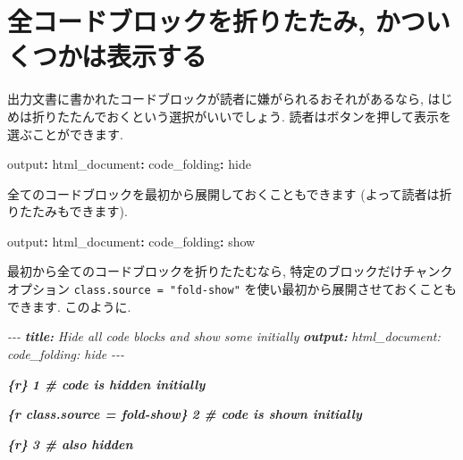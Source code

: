\documentclass[
  11pt,
  lualatex,
  ja=standard]{bxjsreport}
\newenvironment{Shaded}{\begin{snugshade}}{\end{snugshade}}
\newcommand{\AnnotationTok}[1]{\textcolor[rgb]{0.56,0.35,0.01}{\textbf{\textit{#1}}}}
\newcommand{\AttributeTok}[1]{\textcolor[rgb]{0.77,0.63,0.00}{#1}}
\newcommand{\CommentTok}[1]{\textcolor[rgb]{0.56,0.35,0.01}{\textit{#1}}}
\newcommand{\FunctionTok}[1]{\textcolor[rgb]{0.00,0.00,0.00}{#1}}
\newcommand{\InformationTok}[1]{\textcolor[rgb]{0.56,0.35,0.01}{\textbf{\textit{#1}}}}
\newcommand{\KeywordTok}[1]{\textcolor[rgb]{0.13,0.29,0.53}{\textbf{#1}}}
\begin{document}
\hypertarget{fold-show}{%
\section{全コードブロックを折りたたみ, かついくつかは表示する}\label{fold-show}}

出力文書に書かれたコードブロックが読者に嫌がられるおそれがあるなら, はじめは折りたたんでおくという選択がいいでしょう. 読者はボタンを押して表示を選ぶことができます.

\begin{Shaded}
\begin{Highlighting}[]
\FunctionTok{output}\KeywordTok{:}
\AttributeTok{  }\FunctionTok{html\_document}\KeywordTok{:}
\AttributeTok{    }\FunctionTok{code\_folding}\KeywordTok{:}\AttributeTok{ hide}
\end{Highlighting}
\end{Shaded}

全てのコードブロックを最初から展開しておくこともできます (よって読者は折りたたみもできます).

\begin{Shaded}
\begin{Highlighting}[]
\FunctionTok{output}\KeywordTok{:}
\AttributeTok{  }\FunctionTok{html\_document}\KeywordTok{:}
\AttributeTok{    }\FunctionTok{code\_folding}\KeywordTok{:}\AttributeTok{ show}
\end{Highlighting}
\end{Shaded}

最初から全てのコードブロックを折りたたむなら, 特定のブロックだけチャンクオプション \texttt{class.source = "fold-show"} を使い最初から展開させておくこともできます. このように.

\begin{Shaded}
\begin{Highlighting}[]
\CommentTok{{-}{-}{-}}
\AnnotationTok{title:}\CommentTok{ Hide all code blocks and show some initially}
\AnnotationTok{output:}
\CommentTok{  html\_document:}
\CommentTok{    code\_folding: hide}
\CommentTok{{-}{-}{-}}

\InformationTok{\textasciigrave{}\textasciigrave{}\textasciigrave{}\{r\}}
\InformationTok{1  \# code is hidden initially}
\InformationTok{\textasciigrave{}\textasciigrave{}\textasciigrave{}}

\InformationTok{\textasciigrave{}\textasciigrave{}\textasciigrave{}\{r class.source = \textquotesingle{}fold{-}show\textquotesingle{}\}}
\InformationTok{2  \# code is shown initially}
\InformationTok{\textasciigrave{}\textasciigrave{}\textasciigrave{}}

\InformationTok{\textasciigrave{}\textasciigrave{}\textasciigrave{}\{r\}}
\InformationTok{3  \# also hidden}
\InformationTok{\textasciigrave{}\textasciigrave{}\textasciigrave{}}
\end{Highlighting}
\end{Shaded}
\end{document}
